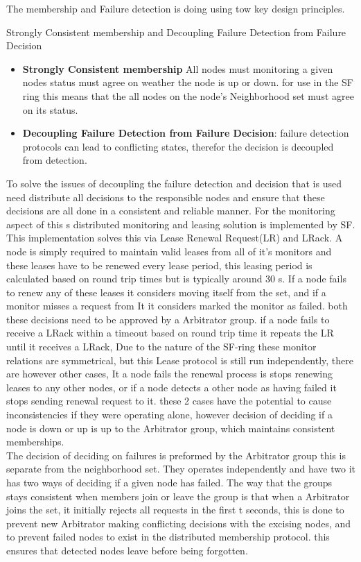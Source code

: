 \documentclass[a4paper,10pt,titlepage]{report}
\begin{document}
The membership and Failure detection is doing using tow key design principles.

Strongly Consistent membership and Decoupling Failure Detection from Failure Decision

\begin{itemize}
    \item \textbf{Strongly Consistent membership} All nodes must monitoring a given nodes status must agree on weather the node is up or down. for use in the SF ring this means that the all nodes on the node's Neighborhood set must agree on its status.
    \item \textbf{Decoupling Failure Detection from Failure Decision}: failure detection protocols can lead to conflicting states, therefor the decision is decoupled from detection.
\end{itemize}

To solve the issues of decoupling the failure detection and decision that is used need distribute all decisions to the responsible nodes and ensure that these decisions are all done in a consistent and reliable manner. For the monitoring aspect of this s distributed monitoring and leasing solution is implemented by SF. This implementation solves this via Lease Renewal Request(LR) and LRack. A node is simply required to maintain valid leases from all of it's monitors and these leases have to be renewed every lease period, this leasing period is calculated based on round trip times but is typically around 30 s. If a node fails to renew any of these leases it considers moving itself from the set, and if a monitor misses a request from It it considers marked the monitor as failed. both these decisions need to be approved by a Arbitrator group. if a node fails to receive a LRack within a timeout based on round trip time it repeats the LR until it receives a LRack, Due to the nature of the SF-ring these monitor relations are symmetrical, but this Lease protocol is still run independently, there are however other cases, It a node fails the renewal process is stops renewing leases to any other nodes, or if a node detects a other node as having failed it stops sending renewal request to it. these 2 cases have the potential to cause inconsistencies if they were operating alone, however decision of deciding if a node is down or up is up to the Arbitrator group, which maintains consistent memberships. \\

The decision of deciding on failures is preformed by the Arbitrator group this is separate from the neighborhood set. They operates independently and have two it has two ways of deciding if a given node has failed. The way that the groups stays consistent when members join or leave the group is that when a Arbitrator joins the set, it initially rejects all requests in the first t seconds, this is done to prevent new Arbitrator making conflicting decisions with the excising nodes, and to prevent failed nodes to exist in the distributed membership protocol. this ensures that detected nodes leave before being forgotten.
\end{document}
